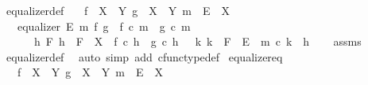 \begin{isabellebody}
\isanewline
{}\isamarkupfalse%
\ equalizer{\isacharunderscore}{\kern0pt}def{}{\isacharcolon}{\kern0pt}\isanewline
\ \ \ {\isachardoublequoteopen}f\ {\isacharcolon}{\kern0pt}\ X\ {\isasymrightarrow}\ Y{\isachardoublequoteclose}\ {\isachardoublequoteopen}g\ {\isacharcolon}{\kern0pt}\ X\ {\isasymrightarrow}\ Y{\isachardoublequoteclose}\ {\isachardoublequoteopen}m\ {\isacharcolon}{\kern0pt}\ E\ {\isasymrightarrow}\ X{\isachardoublequoteclose}\isanewline
\ \ \ {\isachardoublequoteopen}equalizer\ E\ m\ f\ g\ {\isasymlongleftrightarrow}\ {\isacharparenleft}{\kern0pt}{\isacharparenleft}{\kern0pt}f\ {\isasymcirc}\isactrlsub c\ m\ {\isacharequal}{\kern0pt}\ g\ {\isasymcirc}\isactrlsub c\ m{\isacharparenright}{\kern0pt}\isanewline
\ \ \ \ {\isasymand}\ {\isacharparenleft}{\kern0pt}{\isasymforall}\ h\ F{\isachardot}{\kern0pt}\ {\isacharparenleft}{\kern0pt}{\isacharparenleft}{\kern0pt}h\ {\isacharcolon}{\kern0pt}\ F\ {\isasymrightarrow}\ X{\isacharparenright}{\kern0pt}\ {\isasymand}\ {\isacharparenleft}{\kern0pt}f\ {\isasymcirc}\isactrlsub c\ h\ {\isacharequal}{\kern0pt}\ g\ {\isasymcirc}\isactrlsub c\ h{\isacharparenright}{\kern0pt}{\isacharparenright}{\kern0pt}\ {\isasymlongrightarrow}\ {\isacharparenleft}{\kern0pt}{\isasymexists}{\isacharbang}{\kern0pt}\ k{\isachardot}{\kern0pt}\ {\isacharparenleft}{\kern0pt}k\ {\isacharcolon}{\kern0pt}\ F\ {\isasymrightarrow}\ E{\isacharparenright}{\kern0pt}\ {\isasymand}\ m\ {\isasymcirc}\isactrlsub c\ k\ {\isacharequal}{\kern0pt}\ h{\isacharparenright}{\kern0pt}{\isacharparenright}{\kern0pt}{\isacharparenright}{\kern0pt}{\isachardoublequoteclose}\isanewline
%
\isadelimproof
\ \ %
\endisadelimproof
%
\isatagproof
{}\isamarkupfalse%
\ assms\ \isamarkupfalse%
\ equalizer{\isacharunderscore}{\kern0pt}def\ \isamarkupfalse%
\ {\isacharparenleft}{\kern0pt}auto\ simp\ add{\isacharcolon}{\kern0pt}\ cfunc{\isacharunderscore}{\kern0pt}type{\isacharunderscore}{\kern0pt}def{\isacharparenright}{\kern0pt}%
\endisatagproof
{\isafoldproof}%
%
\isadelimproof
\isanewline
%
\endisadelimproof
\isanewline
{}\isamarkupfalse%
\ equalizer{\isacharunderscore}{\kern0pt}eq{\isacharcolon}{\kern0pt}\isanewline
\ \ \ {\isachardoublequoteopen}f\ {\isacharcolon}{\kern0pt}\ X\ {\isasymrightarrow}\ Y{\isachardoublequoteclose}\ {\isachardoublequoteopen}g\ {\isacharcolon}{\kern0pt}\ X\ {\isasymrightarrow}\ Y{\isachardoublequoteclose}\ {\isachardoublequoteopen}m\ {\isacharcolon}{\kern0pt}\ E\ {\isasymrightarrow}\ X{\isachardoublequoteclose}\isanewline

\end{isabellebody}
